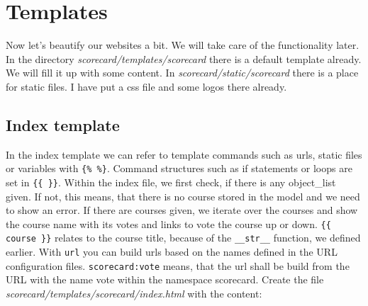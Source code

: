 \section{Templates}

Now let's beautify our websites a bit. We will take care of the functionality later. In the directory \emph{scorecard/templates/scorecard} there is a default template already. We will fill it up with some content. In \emph{scorecard/static/scorecard} there is a place for static files. I have put a css file and some logos there already.

\subsection{Index template}

In the index template we can refer to template commands such as urls, static files or variables with \lstinline|{% %}|. Command structures such as if statements or loops are set in \lstinline|{{ }}|. Within the index file, we first check, if there is any object\_list given. If not, this means, that there is no course stored in the model and we need to show an error. If there are courses given, we iterate over the courses and show the course name with its votes and links to vote the course up or down. \lstinline|{{ course }}| relates to the course title, because of the \lstinline|__str__| function, we defined earlier. With \lstinline|url| you can build urls based on the names defined in the URL configuration files. \lstinline|scorecard:vote| means, that the url shall be build from the URL with the name vote within the namespace scorecard. Create the file \emph{scorecard/templates/scorecard/index.html} with the content:

